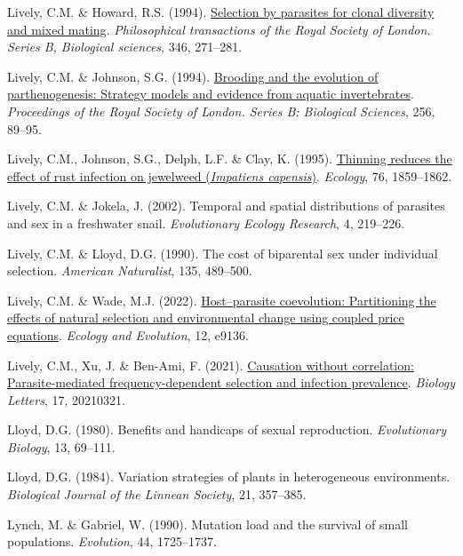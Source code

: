 \documentclass[
  american,
  letterpaper,
]{book}
\newlength{\cslhangindent}
\newenvironment{CSLReferences}[2] %
 {\begin{list}{}{%
  \setlength{\itemindent}{0pt}
  \setlength{\leftmargin}{0pt}
  \setlength{\parsep}{0pt}
  \ifodd #1
   \setlength{\leftmargin}{\cslhangindent}
   \setlength{\itemindent}{-1\cslhangindent}
  \fi
  \setlength{\itemsep}{#2\baselineskip}}}
 {\end{list}}
\begin{document}
\begin{CSLReferences}{1}{0}
Lively, C.M. \& Howard, R.S. (1994).
\href{https://doi.org/10.1098/rstb.1994.0144}{Selection by parasites for
clonal diversity and mixed mating}. \emph{Philosophical transactions of
the Royal Society of London. Series B, Biological sciences}, 346,
271--281.

Lively, C.M. \& Johnson, S.G. (1994).
\href{https://doi.org/10.1098/rspb.1994.0054}{Brooding and the evolution
of parthenogenesis: Strategy models and evidence from aquatic
invertebrates}. \emph{Proceedings of the Royal Society of London. Series
B: Biological Sciences}, 256, 89--95.

Lively, C.M., Johnson, S.G., Delph, L.F. \& Clay, K. (1995).
\href{https://doi.org/10.2307/1940718}{Thinning reduces the effect of
rust infection on jewelweed (\emph{{I}mpatiens capensis})}.
\emph{Ecology}, 76, 1859--1862.

Lively, C.M. \& Jokela, J. (2002). Temporal and spatial distributions of
parasites and sex in a freshwater snail. \emph{Evolutionary Ecology
Research}, 4, 219--226.

Lively, C.M. \& Lloyd, D.G. (1990). The cost of biparental sex under
individual selection. \emph{American Naturalist}, 135, 489--500.

Lively, C.M. \& Wade, M.J. (2022).
\href{https://doi.org/10.1002/ece3.9136}{Host--parasite coevolution:
Partitioning the effects of natural selection and environmental change
using coupled price equations}. \emph{Ecology and Evolution}, 12, e9136.

Lively, C.M., Xu, J. \& Ben-Ami, F. (2021).
\href{https://doi.org/10.1098/rsbl.2021.0321}{Causation without
correlation: Parasite-mediated frequency-dependent selection and
infection prevalence}. \emph{Biology Letters}, 17, 20210321.

Lloyd, D.G. (1980). Benefits and handicaps of sexual reproduction.
\emph{Evolutionary Biology}, 13, 69--111.

Lloyd, D.G. (1984). Variation strategies of plants in heterogeneous
environments. \emph{Biological Journal of the Linnean Society}, 21,
357--385.

Lynch, M. \& Gabriel, W. (1990). Mutation load and the survival of small
populations. \emph{Evolution}, 44, 1725--1737.


\end{CSLReferences}
\end{document}
